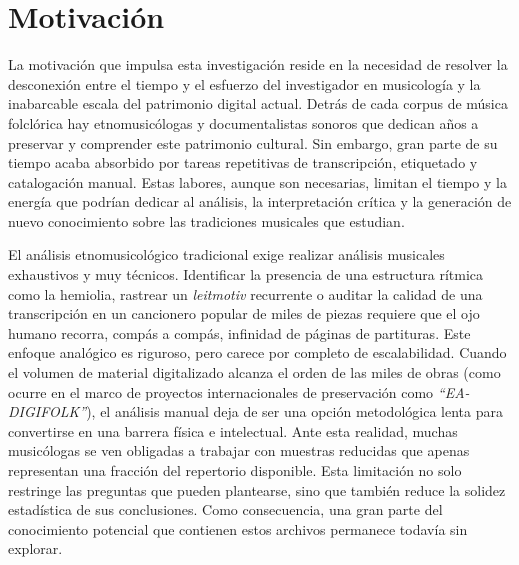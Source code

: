 \section{Motivación}

La motivación que impulsa esta investigación reside en la necesidad de resolver la desconexión entre el tiempo y el esfuerzo del investigador en musicología y la inabarcable escala del patrimonio digital actual. Detrás de cada corpus de música folclórica hay etnomusicólogas y documentalistas sonoros que dedican años a preservar y comprender este patrimonio cultural. Sin embargo, gran parte de su tiempo acaba absorbido por tareas repetitivas de transcripción, etiquetado y catalogación manual. Estas labores, aunque son necesarias, limitan el tiempo y la energía que podrían dedicar al análisis, la interpretación crítica y la generación de nuevo conocimiento sobre las tradiciones musicales que estudian.

El análisis etnomusicológico tradicional exige realizar análisis musicales exhaustivos y muy técnicos. Identificar la presencia de una estructura rítmica como la hemiolia, rastrear un \textit{leitmotiv} recurrente o auditar la calidad de una transcripción en un cancionero popular de miles de piezas requiere que el ojo humano recorra, compás a compás, infinidad de páginas de partituras. Este enfoque analógico es riguroso, pero carece por completo de escalabilidad. Cuando el volumen de material digitalizado alcanza el orden de las miles de obras (como ocurre en el marco de proyectos internacionales de preservación como \textit{``EA-DIGIFOLK''}), el análisis manual deja de ser una opción metodológica lenta para convertirse en una barrera física e intelectual. Ante esta realidad, muchas musicólogas se ven obligadas a trabajar con muestras reducidas que apenas representan una fracción del repertorio disponible. Esta limitación no solo restringe las preguntas que pueden plantearse, sino que también reduce la solidez estadística de sus conclusiones. Como consecuencia, una gran parte del conocimiento potencial que contienen estos archivos permanece todavía sin explorar.

